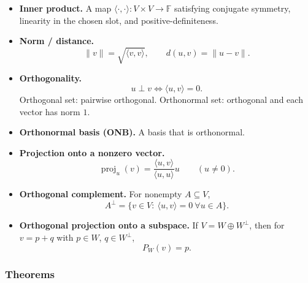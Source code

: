 \begin{itemize}[leftmargin=*]
\item \textbf{Inner product.} A map $\langle\cdot,\cdot\rangle:V\times V\to\mathbb F$ satisfying conjugate symmetry, linearity in the chosen slot, and positive-definiteness.

\item \textbf{Norm / distance.}
\[
\|v\|=\sqrt{\langle v,v\rangle},
\qquad
d(u,v)=\|u-v\|.
\]

\item \textbf{Orthogonality.}
\[
u\perp v \iff \langle u,v\rangle=0.
\]
Orthogonal set: pairwise orthogonal. Orthonormal set: orthogonal and each vector has norm $1$.

\item \textbf{Orthonormal basis (ONB).} A basis that is orthonormal.

\item \textbf{Projection onto a nonzero vector.}
\[
\operatorname{proj}_u(v)=\frac{\langle u,v\rangle}{\langle u,u\rangle}u
\qquad(u\neq 0).
\]

\item \textbf{Orthogonal complement.} For nonempty $A\subseteq V$,
\[
A^\perp=\{v\in V:\ \langle u,v\rangle=0\ \forall u\in A\}.
\]

\item \textbf{Orthogonal projection onto a subspace.} If $V=W\oplus W^\perp$, then for $v=p+q$ with $p\in W$, $q\in W^\perp$,
\[
P_W(v)=p.
\]
\end{itemize}

\subsubsection*{Theorems}

